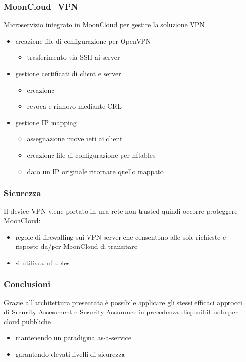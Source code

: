 \begin{frame}
	\frametitle{MoonCloud\_VPN}
	\alert{Microservizio} integrato in MoonCloud per gestire la soluzione VPN
	\begin{itemize}
		\item creazione file di \alert{configurazione} per \alert{OpenVPN}
		      \begin{itemize}
		      	\item \alert{trasferimento} via SSH ai server
		      \end{itemize}
		\item gestione \alert{certificati} di client e server
		      \begin{itemize}
		      	\item creazione
		      	\item revoca e rinnovo mediante \alert{CRL}
		      \end{itemize}
		\item gestione \alert{IP mapping}
		      \begin{itemize}
		      	\item assegnazione nuove reti ai client
		      	\item creazione file di \alert{configurazione} per \alert{nftables}
		      	\item dato un IP originale ritornare quello mappato
		      \end{itemize}
	\end{itemize}
\end{frame}

\begin{frame}
	\frametitle{Sicurezza}
	Il device VPN viene portato in una rete \alert{non trusted} quindi
	occorre \alert{proteggere MoonCloud}:
	\begin{itemize}
		\item \alert{regole di firewalling} sui VPN server che consentono
		      alle \alert{sole richieste e risposte} da/per MoonCloud di transitare
	\end{itemize}
	
	\begin{itemize}
		\item si utilizza \alert{nftables}
	\end{itemize}
\end{frame}


\begin{frame}
    \frametitle{Conclusioni}
    Grazie all'architettura presentata è possibile applicare
    gli stessi efficaci approcci di \alert{Security Assessment}
    e \alert{Security Assurance} in precedenza disponibili solo per cloud pubbliche
    \begin{itemize}
        \item mantenendo un paradigma \alert{as-a-service}
        \item garantendo elevati livelli di sicurezza
    \end{itemize}
\end{frame}

